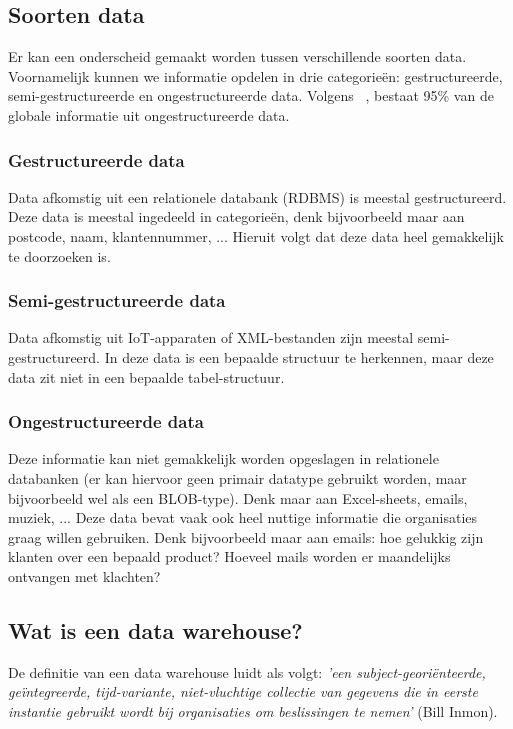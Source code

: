 \subsection{Soorten data}
Er kan een onderscheid gemaakt worden tussen verschillende soorten data. Voornamelijk kunnen we informatie opdelen in drie categorieën: gestructureerde, semi-gestructureerde en ongestructureerde data. Volgens  ~\textcite{Langseth2005}, bestaat 95\% van de globale informatie uit ongestructureerde data. 

\subsubsection{Gestructureerde data}
Data afkomstig uit een relationele databank (RDBMS) is meestal gestructureerd. Deze data is meestal ingedeeld in categorieën, denk bijvoorbeeld maar aan postcode, naam, klantennummer, ... Hieruit volgt dat deze data heel gemakkelijk te doorzoeken is. 

\subsubsection{Semi-gestructureerde data}
Data afkomstig uit IoT-apparaten of XML-bestanden zijn meestal semi-gestructureerd. In deze data is een bepaalde structuur te herkennen, maar deze data zit niet in een bepaalde tabel-structuur.

\subsubsection{Ongestructureerde data}
Deze informatie kan niet gemakkelijk worden opgeslagen in relationele databanken (er kan hiervoor geen primair datatype gebruikt worden, maar bijvoorbeeld wel als een BLOB-type). Denk maar aan Excel-sheets, emails, muziek, ... Deze data bevat vaak ook heel nuttige informatie die organisaties graag willen gebruiken. Denk bijvoorbeeld maar aan emails: hoe gelukkig zijn klanten over een bepaald product? Hoeveel mails worden er maandelijks ontvangen met klachten?

\subsection{Wat is een data warehouse?}
De definitie van een data warehouse luidt als volgt: \textit{'een subject-georiënteerde, geïntegreerde, tijd-variante, niet-vluchtige collectie van gegevens die in eerste instantie gebruikt wordt bij organisaties om beslissingen te nemen'} (Bill Inmon).

